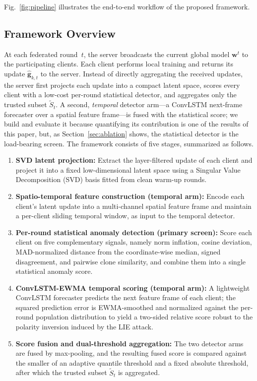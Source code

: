 \documentclass[journal]{IEEEtran}
\begin{document}
Fig.~\ref{fig:pipeline} illustrates the end-to-end workflow of the proposed framework.

\subsection{Framework Overview}

At each federated round~$t$, the server broadcasts the current global model $\mathbf{w}^t$ to the participating clients. Each client performs local training and returns its update $\hat{\mathbf{g}}_{k,t}$ to the server. Instead of directly aggregating the received updates, the server first projects each update into a compact latent space, scores every client with a low-cost per-round statistical detector, and aggregates only the trusted subset $\widetilde{S}_t$. A second, \emph{temporal} detector arm---a ConvLSTM next-frame forecaster over a spatial feature frame---is fused with the statistical score; we build and evaluate it because quantifying its contribution is one of the results of this paper, but, as Section~\ref{sec:ablation} shows, the statistical detector is the load-bearing screen. The framework consists of five stages, summarized as follows.
\begin{enumerate}
    \item \textbf{SVD latent projection:} Extract the layer-filtered update of each client and project it into a fixed low-dimensional latent space using a Singular Value Decomposition (SVD) basis fitted from clean warm-up rounds.
    \item \textbf{Spatio-temporal feature construction (temporal arm):} Encode each client's latent update into a multi-channel spatial feature frame and maintain a per-client sliding temporal window, as input to the temporal detector.
    \item \textbf{Per-round statistical anomaly detection (primary screen):} Score each client on five complementary signals, namely norm inflation, cosine deviation, MAD-normalized distance from the coordinate-wise median, signed disagreement, and pairwise clone similarity, and combine them into a single statistical anomaly score.
    \item \textbf{ConvLSTM-EWMA temporal scoring (temporal arm):} A lightweight ConvLSTM forecaster predicts the next feature frame of each client; the squared prediction error is EWMA-smoothed and normalized against the per-round population distribution to yield a two-sided relative score robust to the polarity inversion induced by the LIE attack.
    \item \textbf{Score fusion and dual-threshold aggregation:} The two detector arms are fused by max-pooling, and the resulting fused score is compared against the smaller of an adaptive quantile threshold and a fixed absolute threshold, after which the trusted subset $\widetilde{S}_t$ is aggregated.
\end{enumerate}
\end{document}
